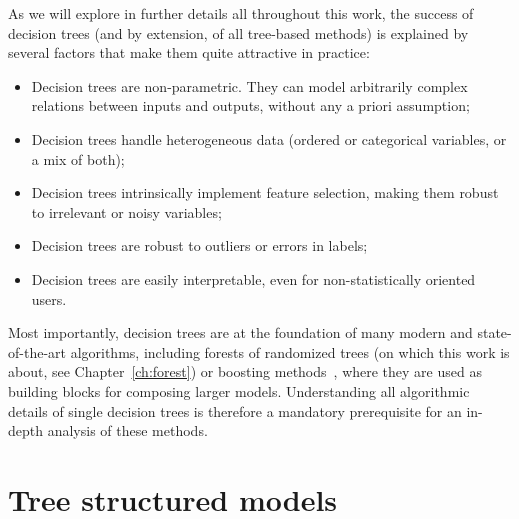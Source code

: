 As we will explore in further details all throughout this work, the success
of decision trees (and by extension, of all tree-based methods) is explained
by several factors that make them quite attractive in practice:
\begin{itemize}
\item Decision trees are non-parametric. They can model arbitrarily complex relations between inputs and outputs, without any a priori assumption;
\item Decision trees handle heterogeneous data (ordered or categorical variables, or a mix of both);
\item Decision trees intrinsically implement feature selection, making them robust to irrelevant or noisy variables;
\item Decision trees are robust to outliers or errors in labels;
\item Decision trees are easily interpretable, even for non-statistically oriented users.
\end{itemize}

Most importantly, decision trees are at the foundation of many modern and
state-of-the-art algorithms, including forests of randomized trees (on which
this work is about, see Chapter~\ref{ch:forest}) or boosting
methods~\citep{freund:1995,friedman:2001}, where they are used as building
blocks for composing larger models. Understanding all algorithmic details of
single decision trees is therefore a mandatory prerequisite for an in-depth
analysis of these methods.


\section{Tree structured models}
\label{sec:3:tree-structured-models}

